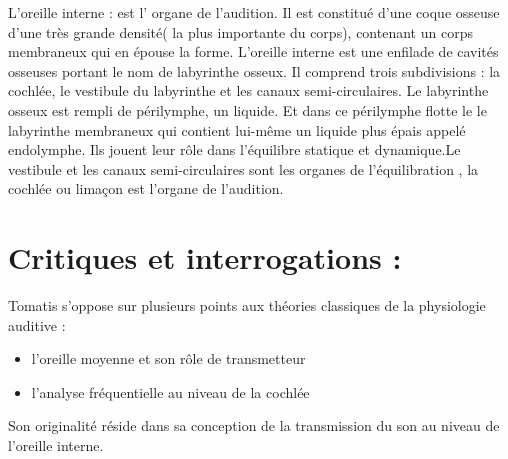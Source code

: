 L'oreille interne : est l' organe de l\textquoteright audition. Il
est constitué d'une coque osseuse d'une très grande densité( la plus
importante du corps), contenant un corps membraneux qui en épouse
la forme. L'oreille interne est une enfilade de cavités osseuses portant
le nom de labyrinthe osseux. Il comprend trois subdivisions : la cochlée,
le vestibule du labyrinthe et les canaux semi-circulaires. Le labyrinthe
osseux est rempli de périlymphe, un liquide. Et dans ce périlymphe
flotte le le labyrinthe membraneux qui contient lui-même un liquide
plus épais appelé endolymphe. Ils jouent leur rôle dans l'équilibre
statique et dynamique.Le vestibule et les canaux semi-circulaires
sont les organes de l\textquoteright équilibration , la cochlée ou
limaçon est l'organe de l'audition. 



\section{Critiques et interrogations :}

Tomatis s'oppose sur plusieurs points aux théories classiques de la
physiologie auditive : 
\begin{itemize}
\item l'oreille moyenne et son rôle de transmetteur 
\item l'analyse fréquentielle au niveau de la cochlée
\end{itemize}
Son originalité réside dans sa conception de la transmission du son
au niveau de l'oreille interne. 

